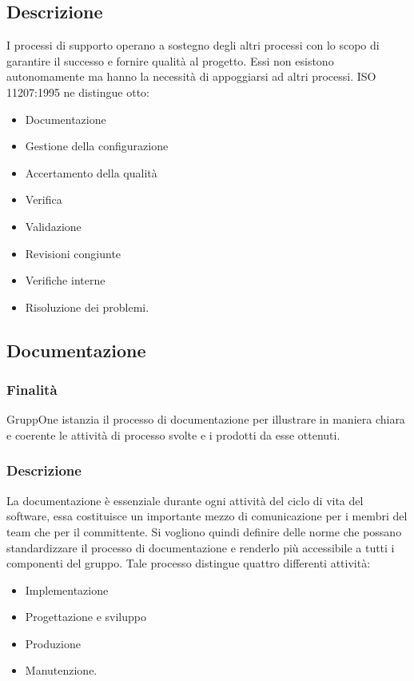 \documentclass[../norme-di-progetto.tex]{subfiles}
\begin{document}
\subsection{Descrizione}%
\label{sub:processi_di_supporto/descrizione}

I processi di supporto operano a sostegno degli altri processi con lo scopo di garantire il successo e fornire qualità al progetto.
Essi non esistono autonomamente ma hanno la necessità di appoggiarsi ad altri processi.
ISO 11207:1995 ne distingue otto:

\begin{itemize}
  \item Documentazione
  \item Gestione della configurazione
  \item Accertamento della qualità
  \item Verifica
  \item Validazione
  \item Revisioni congiunte
  \item Verifiche interne
  \item Risoluzione dei problemi.
\end{itemize}

\subsection{Documentazione}%
\label{sub:documentazione}

\subsubsection{Finalità}%
\label{subs:documentazione/finalita}

GruppOne istanzia il processo di documentazione per illustrare in maniera chiara e coerente le attività di processo svolte e i prodotti da esse ottenuti.

\subsubsection{Descrizione}%
\label{subs:documentazione/descrizione}

La documentazione è essenziale durante ogni attività del ciclo di vita del software, essa costituisce un importante mezzo di comunicazione per i membri del team che per il committente.
Si vogliono quindi definire delle norme che possano standardizzare il processo di documentazione e renderlo più accessibile a tutti i componenti del gruppo.
Tale processo distingue quattro differenti attività:
\begin{itemize}
  \item  Implementazione
  \item  Progettazione e sviluppo
  \item  Produzione
  \item  Manutenzione.
\end{itemize}
\end{document}
